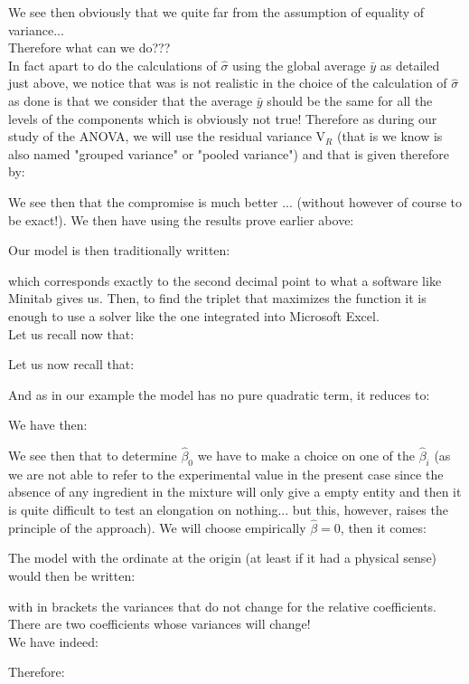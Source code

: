 	\begin{tcolorbox}[colframe=black,colback=white,sharp corners]
	
	We see then obviously that we quite far from the assumption of equality of variance...\\

	Therefore what can we do???\\
	
	In fact apart to do the calculations of $\hat{\sigma}$ using the global average $\bar{y}$ as detailed just above, we notice that was is not realistic in the choice of the calculation of $\hat{\sigma}$ as done is that we consider that the average $\bar{y}$ should be the same for all the levels of the components which is obviously not true! Therefore as during our study of the ANOVA, we will use the residual variance $\text{V}_R$ (that is we know is also named "grouped variance" or "pooled variance") and that is given therefore by:
	
	We see then that the compromise is much better ... (without however of course to be exact!). We then have using the results prove earlier above:
	
	Our model is then traditionally written:
	
	which corresponds exactly to the second decimal point to what a software like Minitab gives us. Then, to find the triplet that maximizes the function it is enough to use a solver like the one  integrated into Microsoft Excel.\\
	
	Let us recall now that:
	\end{tcolorbox}
	
	\begin{tcolorbox}[colframe=black,colback=white,sharp corners]
	Let us now recall that:
	
	And as in our example the model has no pure quadratic term, it reduces to:
	
	We have then:
	
	We see then that to determine $\hat{\beta}_0$ we have to make a choice on one of the $\hat{\beta}_i$ (as we are not able to refer to the experimental value in the present case since the absence of any ingredient in the mixture will only give a empty entity and then it is quite difficult to test an elongation on nothing... but this, however, raises the principle of the approach). We will choose empirically $\hat{\beta}=0$, then it comes:
	
	The model with the ordinate at the origin (at least if it had a physical sense) would then be written:
	
	with in brackets the variances that do not change for the relative coefficients. There are two coefficients whose variances will change!\\
	
	We have indeed:
	
	Therefore:
	
	\end{tcolorbox}
	
